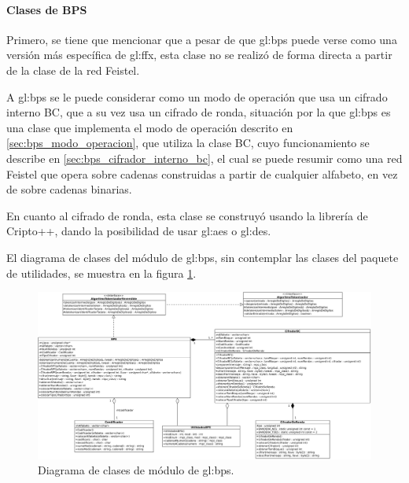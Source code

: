 %
%
%

\paragraph{Clases de BPS}

Primero, se tiene que mencionar que a pesar de que \gls{gl:bps} puede verse como
una versión más específica de \gls{gl:ffx}, esta clase no se realizó de forma
directa a partir de la clase de la red Feistel.

A \gls{gl:bps} se le puede considerar como un modo de operación que usa un
cifrado interno BC, que a su vez usa un cifrado de ronda, situación por la que
\gls{gl:bps} es una clase que implementa el modo de operación descrito en
\ref{sec:bps_modo_operacion}, que utiliza la clase BC, cuyo funcionamiento se
describe en \ref{sec:bps_cifrador_interno_bc}, el cual se puede resumir como
una red Feistel que opera sobre cadenas construidas a partir de cualquier
alfabeto, en vez de sobre cadenas binarias.

En cuanto al cifrado de ronda, esta clase se construyó usando la librería de
Cripto++, dando la posibilidad de usar \gls{gl:aes} o \gls{gl:des}.


El diagrama de clases del módulo de \gls{gl:bps}, sin contemplar las clases del
paquete de utilidades, se muestra en la figura \ref{diagrama_clases_bps}.

\begin{figure}
  \begin{center}
    \includegraphics[width=1.0\linewidth]{diagramas/bps.png}
    \caption{Diagrama de clases de módulo de \gls{gl:bps}.}
    \label{diagrama_clases_bps}
  \end{center}
\end{figure}

